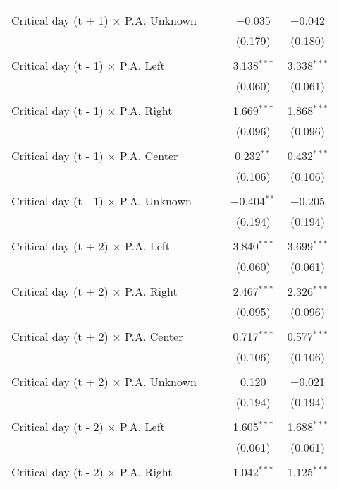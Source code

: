 \documentclass[
]{article}
\begin{document}
\begin{table}[!htbp]
{\begin{tabular}{@{\extracolsep{5pt}}lcccc}
  & & & & \\ 
 Critical day (t + 1) $\times$ P.A. Unknown &  &  & $-$0.035 & $-$0.042 \\ 
  &  &  & (0.179) & (0.180) \\ 
  & & & & \\ 
 Critical day (t - 1) $\times$ P.A. Left &  &  & 3.138$^{***}$ & 3.338$^{***}$ \\ 
  &  &  & (0.060) & (0.061) \\ 
  & & & & \\ 
 Critical day (t - 1) $\times$ P.A. Right &  &  & 1.669$^{***}$ & 1.868$^{***}$ \\ 
  &  &  & (0.096) & (0.096) \\ 
  & & & & \\ 
 Critical day (t - 1) $\times$ P.A. Center &  &  & 0.232$^{**}$ & 0.432$^{***}$ \\ 
  &  &  & (0.106) & (0.106) \\ 
  & & & & \\ 
 Critical day (t - 1) $\times$ P.A. Unknown &  &  & $-$0.404$^{**}$ & $-$0.205 \\ 
  &  &  & (0.194) & (0.194) \\ 
  & & & & \\ 
 Critical day (t + 2) $\times$ P.A. Left &  &  & 3.840$^{***}$ & 3.699$^{***}$ \\ 
  &  &  & (0.060) & (0.061) \\ 
  & & & & \\ 
 Critical day (t + 2) $\times$ P.A. Right &  &  & 2.467$^{***}$ & 2.326$^{***}$ \\ 
  &  &  & (0.095) & (0.096) \\ 
  & & & & \\ 
 Critical day (t + 2) $\times$ P.A. Center &  &  & 0.717$^{***}$ & 0.577$^{***}$ \\ 
  &  &  & (0.106) & (0.106) \\ 
  & & & & \\ 
 Critical day (t + 2) $\times$ P.A. Unknown &  &  & 0.120 & $-$0.021 \\ 
  &  &  & (0.194) & (0.194) \\ 
  & & & & \\ 
 Critical day (t - 2) $\times$ P.A. Left &  &  & 1.605$^{***}$ & 1.688$^{***}$ \\ 
  &  &  & (0.061) & (0.061) \\ 
  & & & & \\ 
 Critical day (t - 2) $\times$ P.A. Right &  &  & 1.042$^{***}$ & 1.125$^{***}$ \\ 

\end{tabular}}
\end{table}
\end{document}
